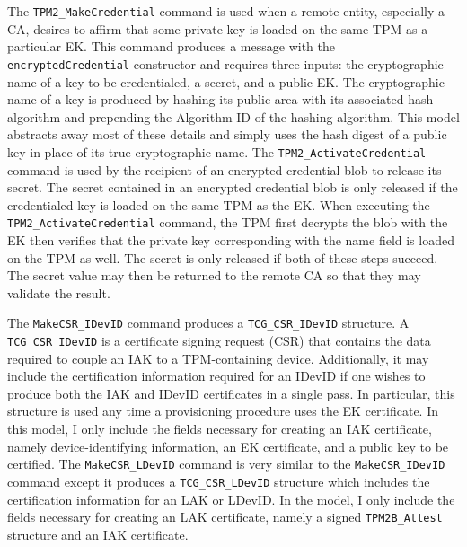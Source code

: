 The \verb|TPM2_MakeCredential| command is used when a remote entity, especially a CA, desires to affirm that some private key is loaded on the same TPM as a particular EK. This command produces a message with the \verb|encryptedCredential| constructor and requires three inputs: the cryptographic name of a key to be credentialed, a secret, and a public EK. The cryptographic name of a key is produced by hashing its public area with its associated hash algorithm and prepending the Algorithm ID of the hashing algorithm. This model abstracts away most of these details and simply uses the hash digest of a public key in place of its true cryptographic name.   
The \verb|TPM2_ActivateCredential| command is used by the recipient of an encrypted credential blob to release its secret. 
The secret contained in an encrypted credential blob is only released if the credentialed key is loaded on the same TPM as the EK.
When executing the \verb|TPM2_ActivateCredential| command, the TPM first decrypts the blob with the EK then verifies that the private key corresponding with the name field is loaded on the TPM as well. The secret is only released if both of these steps succeed. The secret value may then be returned to the remote CA so that they may validate the result.


The \verb|MakeCSR_IDevID| command produces a \verb|TCG_CSR_IDevID| structure.
 A \verb|TCG_CSR_IDevID| is a certificate signing request (CSR) that contains the data required to couple an IAK to a TPM-containing device. Additionally, it may include the certification information required for an IDevID if one wishes to produce both the IAK and IDevID certificates in a single pass. In particular, this structure is used any time a provisioning procedure uses the EK certificate.  In this model, I only include the fields necessary for creating an IAK certificate, namely device-identifying information, an EK certificate, and a public key to be certified. The \verb|MakeCSR_LDevID| command is very similar to the \verb|MakeCSR_IDevID| command except it produces a \verb|TCG_CSR_LDevID| structure which includes the certification information for an LAK or LDevID. In the model, I only include the fields necessary for creating an LAK certificate, namely a signed \verb|TPM2B_Attest| structure and an IAK certificate.


